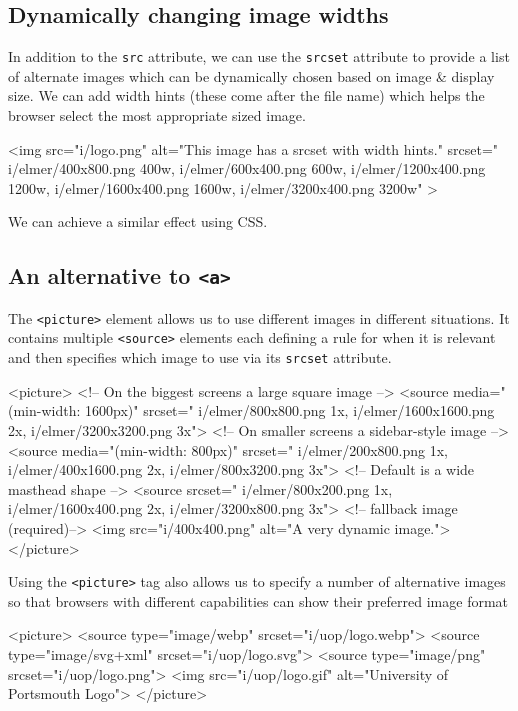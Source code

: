 \subsection*{Dynamically changing image widths}
In addition to the \verb|src| attribute, we can use the \verb|srcset| attribute to provide a list of alternate images which can be dynamically chosen based on image \& display size. We can add width hints (these come after the file name) which helps the browser select the most appropriate sized image.
\begin{html}
<img
    src="i/logo.png"
    alt="This image has a srcset with width hints."
    srcset="
    i/elmer/400x800.png 400w,
    i/elmer/600x400.png 600w,
    i/elmer/1200x400.png 1200w,
    i/elmer/1600x400.png 1600w,
    i/elmer/3200x400.png 3200w"
>
\end{html}

We can achieve a similar effect using CSS. 

\subsection{An alternative to \texttt{<a>}}
The \verb|<picture>| element allows us to use different images in different situations. It contains multiple \verb|<source>| elements each defining a rule for when it is relevant and then specifies which image to use via its \verb|srcset| attribute.
\begin{html}
<picture>
    <!-- On the biggest screens a large square image  -->
    <source
        media="(min-width: 1600px)"
        srcset="
            i/elmer/800x800.png 1x,
            i/elmer/1600x1600.png 2x,
            i/elmer/3200x3200.png 3x">
    <!-- On smaller screens a sidebar-style image  -->
    <source
        media="(min-width: 800px)"
        srcset="
            i/elmer/200x800.png 1x,
            i/elmer/400x1600.png 2x,
            i/elmer/800x3200.png 3x">
    <!-- Default is a wide masthead shape -->
    <source
        srcset="
            i/elmer/800x200.png 1x,
            i/elmer/1600x400.png 2x,
            i/elmer/3200x800.png 3x">
    <!-- fallback image (required)-->
    <img
        src="i/400x400.png"
        alt="A very dynamic image.">
</picture>
\end{html}

Using the \verb|<picture>| tag also allows us to specify a number of alternative images so that browsers with different capabilities can show their preferred image format
\begin{html}
<picture>
  <source
    type="image/webp"
    srcset="i/uop/logo.webp">
  <source
    type="image/svg+xml"
    srcset="i/uop/logo.svg">
  <source
    type="image/png"
    srcset="i/uop/logo.png">
  <img
    src="i/uop/logo.gif"
    alt="University of Portsmouth Logo">
</picture>
\end{html}


